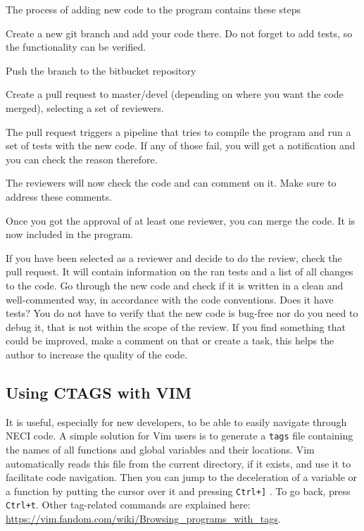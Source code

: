 \documentclass[a4paper,notitlepage,dvipsnames]{scrreprt}
\newenvironment{packed_enum}{
	\begin{enumerate}
		\setlength{\itemsep}{1pt}
		\setlength{\parskip}{0pt}
		\setlength{\parsep}{0pt}
	}{\end{enumerate}}
\let\code\lstinline
\begin{document}
\begin{mdframed}[ %
	linewidth = 2pt, %
	linecolor = red, %
	roundcorner = 6pt, %
	leftmargin = 10, %
	rightmargin = 10, %
	backgroundcolor = gray!20
  ]
  The process of adding new code to the program contains these steps
  \begin{packed_enum}
  \item Create a new git branch and add your code there. Do not forget to add
    tests, so the functionality can be verified.
  \item Push the branch to the bitbucket repository
  \item Create a pull request to master/devel (depending on where you want the
    code merged), selecting a set of reviewers.
  \item The pull request triggers a pipeline that tries to compile the program and run a
    set of tests with the new code. If any of those fail, you will get a
    notification and you can check the reason therefore.
  \item The reviewers will now check the code and can comment on it. Make sure
    to address these comments.
  \item Once you got the approval of at least one reviewer, you can merge the
    code. It is now included in the program.
  \end{packed_enum}
\end{mdframed}

If you have been selected as a reviewer and decide to do the review, check the pull request. It
will contain information on the ran tests and a list of all changes to the
code. Go through the new code and check if it is written in a clean and
well-commented way, in accordance with the code conventions. Does it have tests? You do not
have to verify that the new code is bug-free nor do you need to debug it,
that is not within the scope of the review. If you find something that could
be improved, make a comment on that or create a task, this helps the author to
increase the quality of the code.

\subsection{Using CTAGS with VIM}

It is useful, especially for new developers, to be able to easily navigate through NECI code.
A simple solution for Vim users is to generate a \code{tags} file containing the names of all functions and global variables and their locations.
Vim automatically reads this file from the current directory, if it exists, and use it to facilitate code navigation. Then you can jump to the deceleration of a variable or a function
by putting the cursor over it and pressing \code{Ctrl+]} . To go back, press \code{Ctrl+t}.
Other tag-related commands are explained here: \url{https://vim.fandom.com/wiki/Browsing_programs_with_tags}.
\end{document}
